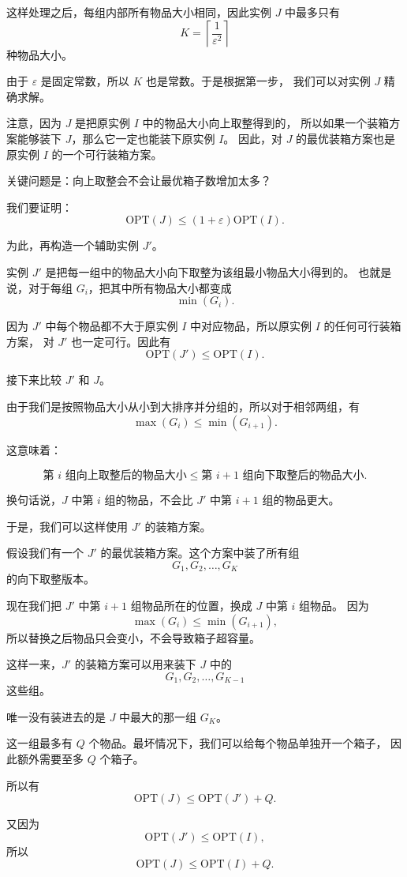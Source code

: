 \documentclass[UTF8,openany,12pt]{ctexbook}
\theoremstyle{remark}
\newcommand{\OPT}{\mathrm{OPT}}
\begin{document}
这样处理之后，每组内部所有物品大小相同，因此实例 $J$ 中最多只有
\[
  K=\left\lceil \frac{1}{\varepsilon^2}\right\rceil
\]
种物品大小。

由于 $\varepsilon$ 是固定常数，所以 $K$ 也是常数。于是根据第一步，
我们可以对实例 $J$ 精确求解。

注意，因为 $J$ 是把原实例 $I$ 中的物品大小向上取整得到的，
所以如果一个装箱方案能够装下 $J$，那么它一定也能装下原实例 $I$。
因此，对 $J$ 的最优装箱方案也是原实例 $I$ 的一个可行装箱方案。

关键问题是：向上取整会不会让最优箱子数增加太多？

我们要证明：
\[
  \OPT(J)\le (1+\varepsilon)\OPT(I).
\]

为此，再构造一个辅助实例 $J'$。

实例 $J'$ 是把每一组中的物品大小向下取整为该组最小物品大小得到的。
也就是说，对于每组 $G_i$，把其中所有物品大小都变成
\[
  \min(G_i).
\]

因为 $J'$ 中每个物品都不大于原实例 $I$ 中对应物品，所以原实例 $I$ 的任何可行装箱方案，
对 $J'$ 也一定可行。因此有
\[
  \OPT(J')\le \OPT(I).
\]

接下来比较 $J'$ 和 $J$。

由于我们是按照物品大小从小到大排序并分组的，所以对于相邻两组，有
\[
  \max(G_i)\le \min(G_{i+1}).
\]

这意味着：

\[
  \text{第 } i \text{ 组向上取整后的物品大小}
  \le
  \text{第 } i+1 \text{ 组向下取整后的物品大小}.
\]

换句话说，$J$ 中第 $i$ 组的物品，不会比 $J'$ 中第 $i+1$ 组的物品更大。

于是，我们可以这样使用 $J'$ 的装箱方案。

假设我们有一个 $J'$ 的最优装箱方案。这个方案中装了所有组
\[
  G_1,G_2,\dots,G_K
\]
的向下取整版本。

现在我们把 $J'$ 中第 $i+1$ 组物品所在的位置，换成 $J$ 中第 $i$ 组物品。
因为
\[
  \max(G_i)\le \min(G_{i+1}),
\]
所以替换之后物品只会变小，不会导致箱子超容量。

这样一来，$J'$ 的装箱方案可以用来装下 $J$ 中的
\[
  G_1,G_2,\dots,G_{K-1}
\]
这些组。

唯一没有装进去的是 $J$ 中最大的那一组 $G_K$。

这一组最多有 $Q$ 个物品。最坏情况下，我们可以给每个物品单独开一个箱子，
因此额外需要至多 $Q$ 个箱子。

所以有
\[
  \OPT(J)\le \OPT(J')+Q.
\]

又因为
\[
  \OPT(J')\le \OPT(I),
\]
所以
\[
  \OPT(J)\le \OPT(I)+Q.
\]
\end{document}
